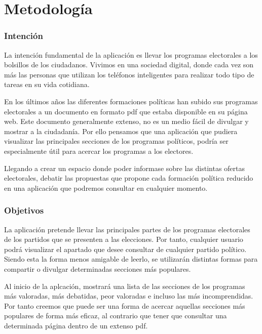 \newpage
\thispagestyle{sectioned}
\chapter{Metodología}

\subsection{Intención}

La intención fundamental de la aplicación es llevar los programas electorales a los bolsillos de los ciudadanos. Vivimos en una sociedad digital, donde cada vez son más las personas que utilizan los teléfonos inteligentes para realizar todo tipo de tareas en su vida cotidiana.

En los últimos años las diferentes formaciones políticas han subido sus programas electorales a un documento en formato pdf que estaba disponible en su página web. Este documento generalmente extenso, no es un medio fácil de divulgar y mostrar a la ciudadanía. Por ello pensamos que una aplicación que pudiera visualizar las principales secciones de los programas políticos, podría ser especialmente útil para acercar los programas a los electores.

Llegando a crear un espacio donde poder informase sobre las distintas ofertas electorales, debatir las propuestas que propone cada formación política reducido en una aplicación que podremos consultar en cualquier momento.

\subsection{Objetivos}

La aplicación pretende llevar las principales partes de los programas electorales de los partidos que se presenten a las elecciones. Por tanto, cualquier usuario podrá visualizar el apartado que desee consultar de cualquier partido político. Siendo esta la forma menos amigable de leerlo, se utilizarán distintas formas para compartir o divulgar determinadas secciones más populares.

Al inicio de la aplcación, mostrará una lista de las secciones de los programas más valoradas, más debatidas, peor valoradas e incluso las más incomprendidas. Por tanto creemos que puede ser una forma de acercar aquellas secciones más populares de forma más eficaz, al contrario que tener que consultar una determinada página dentro de un extenso pdf.

